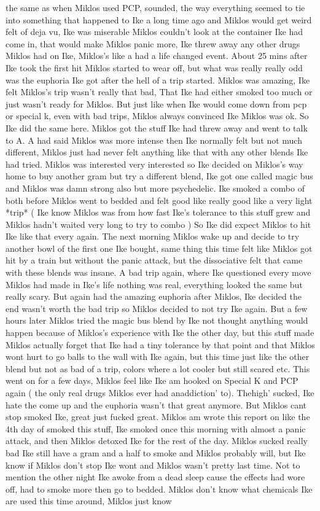 \documentclass[12pt]{book}
\begin{document}
the same as when Miklos used PCP, sounded, the way everything seemed to tie into something that happened to Ike a long time ago and Miklos would get weird felt of deja vu, Ike was miserable Miklos couldn't look at the container Ike had come in, that would make Miklos panic more, Ike threw away any other drugs Miklos had on Ike, Miklos's like a had a life changed event. About 25 mins after Ike took the first hit Miklos started to wear off, but what was really really odd was the euphoria Ike got after the hell of a trip started. Miklos was amazing, Ike felt Miklos's trip wasn't really that bad, That Ike had either smoked too much or just wasn't ready for Miklos. But just like when Ike would come down from pcp or special k, even with bad trips, Miklos always convinced Ike Miklos was ok. So Ike did the same here. Miklos got the stuff Ike had threw away and went to talk to A. A had said Miklos was more intense then Ike normally felt but not much different, Miklos just had never felt anything like that with any other blends Ike had tried. Miklos was interested very interested so Ike decided on Miklos's way home to buy another gram but try a different blend, Ike got one called magic bus and Miklos was damn strong also but more psychedelic. Ike smoked a combo of both before Miklos went to bedded and felt good like really good like a very light *trip* (  Ike know Miklos was from how fast Ike's tolerance to this stuff grew and Miklos hadn't waited very long to try to combo ) So Ike did expect Miklos to hit Ike like that every again. The next morning Miklos wake up and decide to try another bowl of the first one Ike bought, same thing this time felt like Miklos got hit by a train but without the panic attack, but the dissociative felt that came with these blends was insane. A bad trip again, where Ike questioned every move Miklos had made in Ike's life nothing was real, everything looked the same but really scary. But again had the amazing euphoria after Miklos, Ike decided the end wasn't worth the bad trip so Miklos decided to not try Ike again. But a few hours later Miklos tried the magic bus blend by Ike not thought anything would happen because of Miklos's experience with Ike the other day, but this stuff made Miklos actually forget that Ike had a tiny tolerance by that point and that Miklos wont hurt to go balls to the wall with Ike again, but this time just like the other blend but not as bad of a trip, colors where a lot cooler but still scared etc. This went on for a few days, Miklos feel like Ike am hooked on Special K and PCP again ( the only real drugs Miklos ever had anaddiction' to). Thehigh' sucked, Ike hate the come up and the euphoria wasn't that great anymore. But Miklos cant stop smoked Ike, great just fucked great. Miklos am wrote this report on like the 4th day of smoked this stuff, Ike smoked once this morning with almost a panic attack, and then Miklos detoxed Ike for the rest of the day. Miklos sucked really bad Ike still have a gram and a half to smoke and Miklos probably will, but Ike know if Miklos don't stop Ike wont and Miklos wasn't pretty last time. Not to mention the other night Ike awoke from a dead sleep cause the effects had wore off, had to smoke more then go to bedded. Miklos don't know what chemicals Ike are used this time around, Miklos just know 
\end{document}
